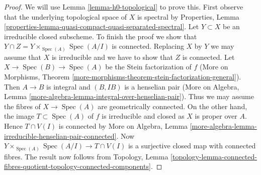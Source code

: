 \documentclass[10pt,a4paper]{amsart}
\theoremstyle{plain}
\theoremstyle{definition}
\theoremstyle{remark}
\numberwithin{equation}{subsection}
\def\Spec{\mathop{\mathrm{Spec}}}
\begin{document}
\begin{proof}
We will use Lemma \ref{lemma-h0-topological} to prove this. First observe
that the underlying topological space of $X$ is spectral by Properties, Lemma
\ref{properties-lemma-quasi-compact-quasi-separated-spectral}.
Let $Y \subset X$ be an irreducible closed subscheme. To finish the proof
we show that $Y \cap Z = Y \times_{\Spec(A)} \Spec(A/I)$ is connected.
Replacing $X$ by $Y$
we may assume that $X$ is irreducible and we have to show that $Z$
is connected. Let $X \to \Spec(B) \to \Spec(A)$ be the Stein factorization
of $f$ (More on Morphisms, Theorem
\ref{more-morphisms-theorem-stein-factorization-general}).
Then $A \to B$ is integral and $(B, IB)$ is a henselian pair
(More on Algebra, Lemma \ref{more-algebra-lemma-integral-over-henselian-pair}).
Thus we may assume the fibres of $X \to \Spec(A)$ are geometrically
connected. On the other hand, the image $T \subset \Spec(A)$ of $f$
is irreducible and closed as $X$ is proper over $A$. Hence $T \cap V(I)$
is connected by More on Algebra, Lemma
\ref{more-algebra-lemma-irreducible-henselian-pair-connected}.
Now $Y \times_{\Spec(A)} \Spec(A/I) \to T \cap V(I)$
is a surjective closed map with connected fibres.
The result now follows from Topology, Lemma
\ref{topology-lemma-connected-fibres-quotient-topology-connected-components}.
\end{proof}
\end{document}

